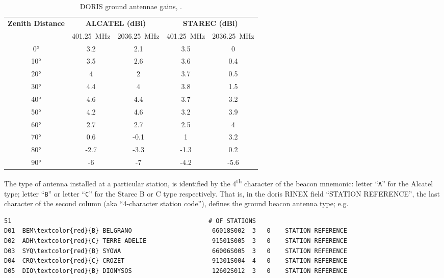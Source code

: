 \begin{table}[h!]
    \centering
    \begin{tabular}{|c | c | c | c | c|}
        \hline
        \textbf{Zenith Distance} & \multicolumn{2}{c}{\textbf{ALCATEL (dBi)}} & \multicolumn{2}{c|}{\textbf{STAREC (dBi)}} \\
                        & \SI{401.25}{\mega\hertz} & \SI{2036.25}{\mega\hertz} &  \SI{401.25}{\mega\hertz} & \SI{2036.25}{\mega\hertz}\\
        \hline
        \ang{0}&3.2&2.1&3.5&0 \\
        \ang{10}&3.5&2.6&3.6&0.4\\
        \ang{20}&4&2&3.7&0.5\\
        \ang{30}&4.4&4&3.8&1.5\\
        \ang{40}&4.6&4.4&3.7&3.2\\
        \ang{50}&4.2&4.6&3.2&3.9\\
        \ang{60}&2.7&2.7&2.5&4\\
        \ang{70}&0.6&-0.1&1&3.2\\
        \ang{80}&-2.7&-3.3&-1.3&0.2\\
        \ang{90}&-6&-7&-4.2&-5.6\\
        \hline
    \end{tabular}
    \caption{DORIS ground antennae gains, \cite{DORISGSM}.}
    \label{table:antenna-gains}
\end{table}

The type of antenna installed at a particular station, is identified by the 
4\textsuperscript{th} character of the beacon mnemonic: letter ``\texttt{A}'' for the 
Alcatel type; letter ``\texttt{B}'' or letter ``\texttt{C}'' for the Starec B 
or C type respectively. That is, in the \gls{doris} RINEX field ``STATION REFERENCE'', 
the last character of the second column (aka ``4-character station code''), 
defines the ground beacon antenna type; e.g.

\begin{adjustbox}{max width=\linewidth , fbox=0.5pt}
\begin{BVerbatim}[commandchars=\\\{\}]
    51                                                      # OF STATIONS       
D01  BEM\textcolor{red}{B} BELGRANO                      66018S002  3   0    STATION REFERENCE   
D02  ADH\textcolor{red}{C} TERRE ADELIE                  91501S005  3   0    STATION REFERENCE   
D03  SYQ\textcolor{red}{B} SYOWA                         66006S005  3   0    STATION REFERENCE   
D04  CRQ\textcolor{red}{C} CROZET                        91301S004  4   0    STATION REFERENCE   
D05  DIO\textcolor{red}{B} DIONYSOS                      12602S012  3   0    STATION REFERENCE
\end{BVerbatim}
\end{adjustbox}

